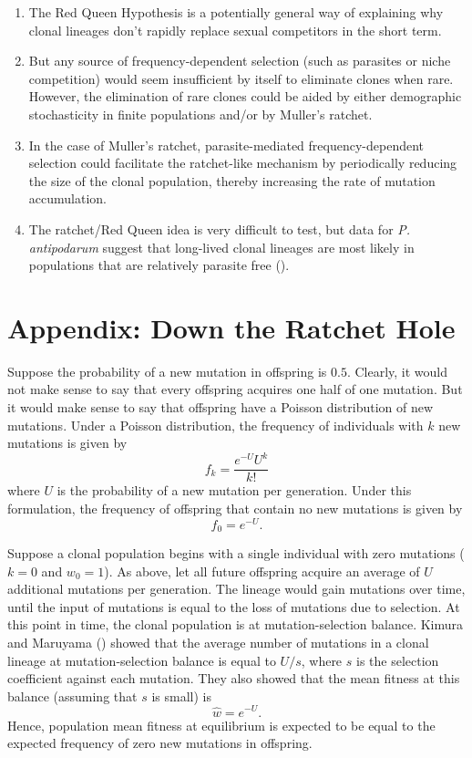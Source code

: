 \documentclass[
  american,
  letterpaper,
]{book}
\providecommand{\tightlist}{%
  \setlength{\itemsep}{0pt}\setlength{\parskip}{0pt}}\usepackage{longtable,booktabs,array}
\begin{document}
\begin{enumerate}
\def\labelenumi{\arabic{enumi}.}
\tightlist
\item
  The Red Queen Hypothesis is a potentially general way of explaining
  why clonal lineages don't rapidly replace sexual competitors in the
  short term.
\item
  But any source of frequency-dependent selection (such as parasites or
  niche competition) would seem insufficient by itself to eliminate
  clones when rare. However, the elimination of rare clones could be
  aided by either demographic stochasticity in finite populations and/or
  by Muller's ratchet.
\item
  In the case of Muller's ratchet, parasite-mediated frequency-dependent
  selection could facilitate the ratchet-like mechanism by periodically
  reducing the size of the clonal population, thereby increasing the
  rate of mutation accumulation.
\item
  The ratchet/Red Queen idea is very difficult to test, but data for
  \emph{P. antipodarum} suggest that long-lived clonal lineages are most
  likely in populations that are relatively parasite free
  ().
\end{enumerate}

\section{Appendix: Down the Ratchet Hole}\label{sec-app-6}

Suppose the probability of a new mutation in offspring is \(0.5\).
Clearly, it would not make sense to say that every offspring acquires
one half of one mutation. But it would make sense to say that offspring
have a Poisson distribution of new mutations. Under a Poisson
distribution, the frequency of individuals with \(k\) new mutations is
given by \[f_k=\frac{e^{-U}U^k}{k!}\] where \(U\) is the probability of
a new mutation per generation. Under this formulation, the frequency of
offspring that contain no new mutations is given by \[f_0=e^{-U}.\]

Suppose a clonal population begins with a single individual with zero
mutations (\(k = 0\) and \(w_0 = 1\)). As above, let all future
offspring acquire an average of \(U\) additional mutations per
generation. The lineage would gain mutations over time, until the input
of mutations is equal to the loss of mutations due to selection. At this
point in time, the clonal population is at mutation-selection balance.
Kimura and Maruyama () showed that the
average number of mutations in a clonal lineage at mutation-selection
balance is equal to \(U/s\), where \(s\) is the selection coefficient
against each mutation. They also showed that the mean fitness at this
balance (assuming that \(s\) is small) is \[\hat{w}=e^{-U}.\] Hence,
population mean fitness at equilibrium is expected to be equal to the
expected frequency of zero new mutations in offspring.
\end{document}
